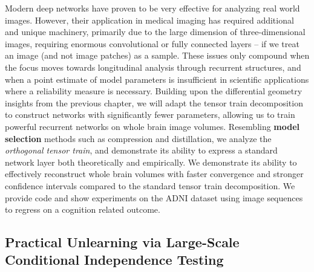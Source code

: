Modern deep networks have proven to be very effective for analyzing real world images.
However, their application in medical imaging has required additional and unique machinery,
primarily due to the large dimension of three-dimensional images,
requiring enormous convolutional or fully connected layers --
if we treat an image (and not image patches) as a sample. 
These issues only compound when the focus moves towards longitudinal analysis
through recurrent structures, and when a point estimate of model parameters is insufficient 
in scientific applications where a reliability measure is necessary.
Building upon the differential geometry insights from the previous chapter, 
we will adapt 
the tensor train decomposition to construct networks
with significantly fewer parameters,
allowing us to train powerful recurrent networks on whole brain image volumes. 
Resembling \textbf{model selection} methods
such as compression and distillation,
we analyze 
the \textit{orthogonal tensor train},
and demonstrate its ability to express a standard network layer both theoretically and empirically.
We 
demonstrate its ability to 
effectively reconstruct whole brain volumes
with faster convergence and stronger confidence intervals
compared to the standard tensor train decomposition. 
We provide code and show experiments on the ADNI dataset
using image sequences to regress on a cognition related outcome.

\subsection{Practical Unlearning via Large-Scale Conditional Independence Testing}

